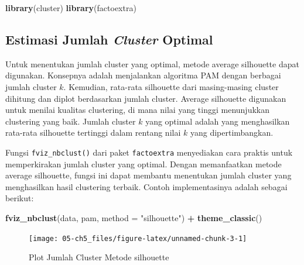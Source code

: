 \documentclass[
  oneside]{book}
\newenvironment{Shaded}{\begin{snugshade}}{\end{snugshade}}
\newcommand{\AttributeTok}[1]{\textcolor[rgb]{0.13,0.29,0.53}{#1}}
\newcommand{\FunctionTok}[1]{\textcolor[rgb]{0.13,0.29,0.53}{\textbf{#1}}}
\newcommand{\NormalTok}[1]{#1}
\newcommand{\SpecialCharTok}[1]{\textcolor[rgb]{0.81,0.36,0.00}{\textbf{#1}}}
\newcommand{\StringTok}[1]{\textcolor[rgb]{0.31,0.60,0.02}{#1}}
\begin{document}
\begin{Shaded}
\begin{Highlighting}[]
\FunctionTok{library}\NormalTok{(cluster)}
\FunctionTok{library}\NormalTok{(factoextra)}
\end{Highlighting}
\end{Shaded}

\subsection*{\texorpdfstring{Estimasi Jumlah \emph{Cluster} Optimal}{Estimasi Jumlah Cluster Optimal}}\label{estimasi-jumlah-cluster-optimal-1}

Untuk menentukan jumlah cluster yang optimal, metode average silhouette dapat digunakan. Konsepnya adalah menjalankan algoritma PAM dengan berbagai jumlah cluster \(k\). Kemudian, rata-rata silhouette dari masing-masing cluster dihitung dan diplot berdasarkan jumlah cluster. Average silhouette digunakan untuk menilai kualitas clustering, di mana nilai yang tinggi menunjukkan clustering yang baik. Jumlah cluster \(k\) yang optimal adalah yang menghasilkan rata-rata silhouette tertinggi dalam rentang nilai \(k\) yang dipertimbangkan.

Fungsi \texttt{fviz\_nbclust()} dari paket \texttt{factoextra} menyediakan cara praktis untuk memperkirakan jumlah cluster yang optimal. Dengan memanfaatkan metode average silhouette, fungsi ini dapat membantu menentukan jumlah cluster yang menghasilkan hasil clustering terbaik. Contoh implementasinya adalah sebagai berikut:

\begin{Shaded}
\begin{Highlighting}[]
\FunctionTok{fviz\_nbclust}\NormalTok{(data, pam, }\AttributeTok{method =} \StringTok{"silhouette"}\NormalTok{) }\SpecialCharTok{+}
  \FunctionTok{theme\_classic}\NormalTok{()}
\end{Highlighting}
\end{Shaded}

\begin{figure}[h]

{\centering \texttt{[image: 05-ch5\_files/figure-latex/unnamed-chunk-3-1]} 

}

\caption{Plot Jumlah Cluster Metode silhouette}\label{fig:unnamed-chunk-3}
\end{figure}
\end{document}
